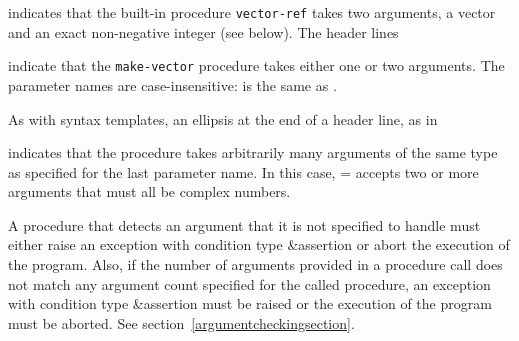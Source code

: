 \noindent{}\unpenalty

indicates that the built-in procedure {\tt vector-ref} takes
two arguments, a vector  and an exact non-negative integer
 (see below).  The header lines

\noindent%
\unpenalty

indicate that the {\tt make-vector} procedure takes
either one or two arguments.  The parameter names are
case-insensitive:  is the same as .

As with syntax templates, an ellipsis \dotsfoo{} at the end of a header
line, as in

\noindent{}\unpenalty

indicates that the procedure takes arbitrarily many arguments of the
same type as specified for the last parameter name.  In this case,
{\cf =} accepts two or more arguments that must all be complex
numbers.

\label{typeconventions}
A procedure that detects an argument that it is not specified to
handle must either raise an exception with condition type
{\cf\&assertion} or abort the execution of the program.  Also, if the
number of arguments provided in a procedure call does not match any
argument count specified for the called procedure, an exception with
condition type {\cf\&assertion} must be raised or the execution of the
program must be aborted.  See section~\ref{argumentcheckingsection}.

